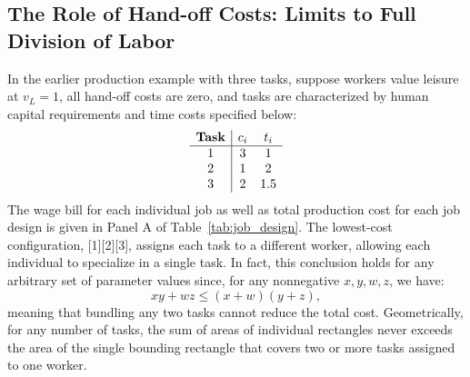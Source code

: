 \documentclass{article}
\theoremstyle{plain}
\theoremstyle{plain}
\begin{document}
\begin{comment}
The firm seeks to minimize the total cost of producing the final good by optimally designing jobs.
The overall production cost per unit of the good is the solution to:
\begin{align}
\label{eq:totalcost_no_handoff}
\underset{\{\J_j\}_{j=1}^J}{min} \ 
\text{TotalCost}(\J; \hccost{}, \timecost{})
= 
\sum_{j=1}^J \Biggl[\Biggl(v_L + \sum_{i \in \J_j} \hccost{i} \Biggr) \Biggl(\sum_{i \in \J_j} \timecost{i} \Biggr)\Biggr],
\end{align}
where $\hccost{}$ and $\timecost{}$ are vectors of task skill and time requirements. 
\end{comment}

\subsection{The Role of Hand-off Costs: Limits to Full Division of Labor}

In the earlier  production example with three tasks, suppose workers value leisure at $v_L = 1$, all hand-off costs are zero, and tasks are characterized by human capital requirements and time costs specified below:
\[
\begin{array}{c|ccc}
\textbf{Task} & c_{i} & t_{i} \\ \hline
1 & 3  & 1 \\
2 & 1 & 2  \\
3 & 2   & 1.5 \\
\end{array}
\]
The wage bill for each individual job as well as total production cost for each job design is given in Panel A of Table~\ref{tab:job_design}.
The lowest‐cost configuration, [1][2][3], assigns each task to a different worker, allowing each individual to specialize in a single task.  
In fact, this conclusion holds for any arbitrary set of parameter values since, for any nonnegative $x,y,w,z$, we have:
\[
  xy + wz \le (x + w)(y + z),
\]
meaning that bundling any two tasks cannot reduce the total cost.  
Geometrically, for any number of tasks, the sum of areas of individual rectangles never exceeds the area of the single bounding rectangle that covers two or more tasks assigned to one worker.
\end{document}
